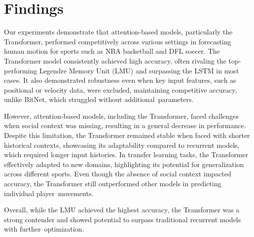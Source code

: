 \section{Findings}
\label{sec:findings}
Our experiments demonstrate that attention-based models, particularly the Transformer, performed competitively across various settings in forecasting human motion for sports such as NBA basketball and DFL soccer. The Transformer model consistently achieved high accuracy, often rivaling the top-performing Legendre Memory Unit (LMU) and surpassing the LSTM in most cases. It also demonstrated robustness even when key input features, such as positional or velocity data, were excluded, maintaining competitive accuracy, unlike BitNet, which struggled without additional~parameters.

However, attention-based models, including the Transformer, faced challenges when social context was missing, resulting in a general decrease in performance. Despite this limitation, the Transformer remained stable when faced with shorter historical contexts, showcasing its adaptability compared to recurrent models, which required longer input histories. In transfer learning tasks, the Transformer effectively adapted to new domains, highlighting its potential for generalization across different sports. Even though the absence of social context impacted accuracy, the Transformer still outperformed other models in predicting individual player~movements.

Overall, while the LMU achieved the highest accuracy, the Transformer was a strong contender and showed potential to surpass traditional recurrent models with further~optimization.

